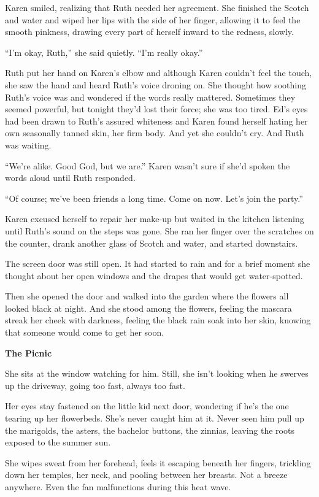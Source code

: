 \documentclass[
]{article}
\begin{document}
Karen smiled, realizing that Ruth needed her agreement. She finished the
Scotch and water and wiped her lips with the side of her finger,
allowing it to feel the smooth pinkness, drawing every part of herself
inward to the redness, slowly.

``I'm okay, Ruth,'' she said quietly. ``I'm really okay.''

Ruth put her hand on Karen's elbow and although Karen couldn't feel the
touch, she saw the hand and heard Ruth's voice droning on. She thought
how soothing Ruth's voice was and wondered if the words really mattered.
Sometimes they seemed powerful, but tonight they'd lost their force; she
was too tired. Ed's eyes had been drawn to Ruth's assured whiteness and
Karen found herself hating her own seasonally tanned skin, her firm
body. And yet she couldn't cry. And Ruth was waiting.

``We're alike. Good God, but we are.'' Karen wasn't sure if she'd spoken
the words aloud until Ruth responded.

``Of course; we've been friends a long time. Come on now. Let's join the
party.''

Karen excused herself to repair her make-up but waited in the kitchen
listening until Ruth's sound on the steps was gone. She ran her finger
over the scratches on the counter, drank another glass of Scotch and
water, and started downstairs.

The screen door was still open. It had started to rain and for a brief
moment she thought about her open windows and the drapes that would get
water-spotted.

Then she opened the door and walked into the garden where the flowers
all looked black at night. And she stood among the flowers, feeling the
mascara streak her cheek with darkness, feeling the black rain soak into
her skin, knowing that someone would come to get her soon.

\textbf{\hfill\break
}

\textbf{The Picnic}

She sits at the window watching for him. Still, she isn't looking when
he swerves up the drive­way, going too fast, always too fast.

Her eyes stay fastened on the little kid next door, wondering if he's
the one tearing up her flowerbeds. She's never caught him at it. Never
seen him pull up the marigolds, the asters, the bache­lor buttons, the
zinnias, leaving the roots exposed to the summer sun.

She wipes sweat from her forehead, feels it escaping beneath her
fingers, trickling down her temples, her neck, and pooling between her
breasts. Not a breeze anywhere. Even the fan malfunc­tions during this
heat wave.
\end{document}
